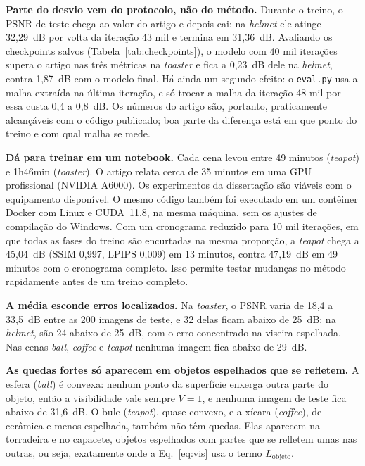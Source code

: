 \documentclass[conference]{IEEEtran}
\begin{document}
\textbf{Parte do desvio vem do protocolo, não do método.} Durante o treino, o PSNR de teste chega ao valor do artigo e depois cai: na \textit{helmet} ele atinge 32,29~dB por volta da iteração 43 mil e termina em 31,36~dB. Avaliando os checkpoints salvos (Tabela~\ref{tab:checkpoints}), o modelo com 40 mil iterações supera o artigo nas três métricas na \textit{toaster} e fica a 0,23~dB dele na \textit{helmet}, contra 1,87~dB com o modelo final. Há ainda um segundo efeito: o \texttt{eval.py} usa a malha extraída na última iteração, e só trocar a malha da iteração 48 mil por essa custa 0,4 a 0,8~dB. Os números do artigo são, portanto, praticamente alcançáveis com o código publicado; boa parte da diferença está em que ponto do treino e com qual malha se mede.

\textbf{Dá para treinar em um notebook.} Cada cena levou entre 49 minutos (\textit{teapot}) e 1h46min (\textit{toaster}). O artigo relata cerca de 35 minutos em uma GPU profissional (NVIDIA A6000). Os experimentos da dissertação são viáveis com o equipamento disponível. O mesmo código também foi executado em um contêiner Docker com Linux e CUDA~11.8, na mesma máquina, sem os ajustes de compilação do Windows. Com um cronograma reduzido para 10 mil iterações, em que todas as fases do treino são encurtadas na mesma proporção, a \textit{teapot} chega a 45,04~dB (SSIM 0,997, LPIPS 0,009) em 13 minutos, contra 47,19~dB em 49 minutos com o cronograma completo. Isso permite testar mudanças no método rapidamente antes de um treino completo.

\textbf{A média esconde erros localizados.} Na \textit{toaster}, o PSNR varia de 18,4 a 33,5~dB entre as 200 imagens de teste, e 32 delas ficam abaixo de 25~dB; na \textit{helmet}, são 24 abaixo de 25~dB, com o erro concentrado na viseira espelhada. Nas cenas \textit{ball}, \textit{coffee} e \textit{teapot} nenhuma imagem fica abaixo de 29~dB.

\textbf{As quedas fortes só aparecem em objetos espelhados que se refletem.} A esfera (\textit{ball}) é convexa: nenhum ponto da superfície enxerga outra parte do objeto, então a visibilidade vale sempre $V=1$, e nenhuma imagem de teste fica abaixo de 31,6~dB. O bule (\textit{teapot}), quase convexo, e a xícara (\textit{coffee}), de cerâmica e menos espelhada, também não têm quedas. Elas aparecem na torradeira e no capacete, objetos espelhados com partes que se refletem umas nas outras, ou seja, exatamente onde a Eq.~\eqref{eq:vis} usa o termo $L_{\text{objeto}}$.
\end{document}
